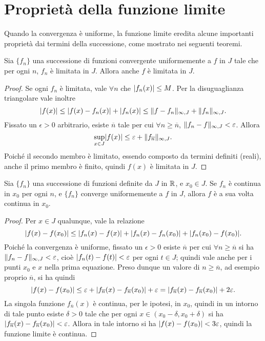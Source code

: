 \section{Proprietà della funzione limite}
Quando la convergenza è uniforme, la funzione limite eredita alcune importanti proprietà dai termini della successione, come mostrato nei seguenti teoremi.
\begin{teorema} \label{t:unif_limitata}
Sia $\{f_n\}$ una successione di funzioni convergente uniformemente a $f$ in $J$ tale che per ogni $n$, $f_n$ è limitata in $J$. Allora anche $f$ è limitata in $J$.
\end{teorema}
\begin{proof}
Se ogni $f_n$ è limitata, vale $\forall n$ che $\lvert f_n(x)\rvert\leq M$.
Per la disuguaglianza triangolare vale inoltre
\[
\lvert f(x)\rvert\leq\lvert f(x)-f_n(x)\rvert+\lvert f_n(x)\rvert\leq\lVert f-f_n\rVert_{\infty,J}+\lVert f_n\rVert_{\infty,J}.
\]
Fissato un $\epsilon>0$ arbitrario, esiste $\overline{n}$ tale per cui $\forall n\geq\overline{n}$, $\lVert f_n-f\rVert_{\infty,J}<\varepsilon$. Allora
\[
\sup_{x\in J}\lvert f(x)\rvert\leq\varepsilon+\lVert f_{\overline n}\rVert_{\infty,J}.
\]
Poiché il secondo membro è limitato, essendo composto da termini definiti (reali), anche il primo membro è finito, quindi $f(x)$ è limitata in $J$.
\end{proof}
\begin{teorema} \label{t:continuita_conv_uniforme}
Sia $\{f_n\}$ una successione di funzioni definite da $J$ in $\mathbb{R}$, e $x_0\in J$. Se $f_n$ è continua in $x_0$ per ogni $n$, e $\{f_n\}$ converge uniformemente a $f$ in $J$, allora $f$ è a sua volta continua in $x_0$.
\end{teorema}
\begin{proof}
	Per $x\in J$ qualunque, vale la relazione
	\begin{equation}
		\lvert f(x)-f(x_0)\rvert\leq\lvert f_n(x)-f(x)\rvert+\lvert f_n(x)-f_n(x_0)\rvert+\lvert f_n(x_0)-f(x_0)\rvert.
	\end{equation}
	Poiché la convergenza è uniforme, fissato un $\epsilon>0$ esiste $\overline{n}$ per cui $\forall n\geq\overline{n}$ si ha $\lVert f_n-f\rVert_{\infty,J}<\varepsilon$, cioè $\lvert f_n(t)-f(t)\rvert<\varepsilon$ per ogni $t\in J$; quindi vale anche per i punti $x_0$ e $x$ nella prima equazione. Preso dunque un valore di $n\geq\overline{n}$, ad esempio proprio $\overline{n}$, si ha quindi
	\begin{equation}
		\lvert f(x)-f(x_0)\rvert\leq\varepsilon+\lvert f_{\overline n}(x)-f_{\overline n}(x_0)\rvert+\varepsilon=\lvert f_{\overline n}(x)-f_{\overline n}(x_0)\rvert+2\varepsilon.
	\end{equation}
	La singola funzione $f_{\overline n}(x)$ è continua, per le ipotesi, in $x_0$, quindi in un intorno di tale punto esiste $\delta>0$ tale che per ogni $x\in(x_0-\delta,x_0+\delta)$ si ha $\lvert f_{\overline n}(x)-f_{\overline n}(x_0)\rvert<\varepsilon$.
	Allora in tale intorno si ha $\lvert f(x)-f(x_0)\rvert<3\varepsilon$, quindi la funzione limite è continua.
\end{proof}
